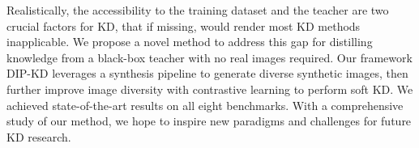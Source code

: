 Realistically, the accessibility to the training dataset and the teacher are two crucial factors for KD, that if missing, would render most KD methods inapplicable.
We propose a novel method to address this gap for distilling knowledge from a black-box teacher with no real images required.
Our framework DIP-KD leverages a synthesis pipeline to generate diverse synthetic images, then further improve image diversity with contrastive learning to perform soft KD.
We achieved state-of-the-art results on all eight benchmarks.
With a comprehensive study of our method, we hope to inspire new paradigms and challenges for future KD research.
